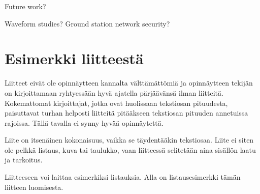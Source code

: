 \documentclass[english, 12pt, a4paper, elec, utf8, a-1b, online]{aaltothesis}
\begin{document}
Future work?

Waveform studies?
Ground station network security?







\clearpage

\thesisbibliography




\clearpage

\thesisappendix

\section{Esimerkki liitteest\"a\label{LiiteA}}

Liitteet eiv\"at ole opinn\"aytteen kannalta v\"altt\"am\"att\"omi\"a ja 
opinn\"aytteen tekij\"an on 
kirjoittamaan ryhtyess\"a\"an hyv\"a ajatella p\"arj\"a\"av\"ans\"a ilman liitteit\"a.
Kokemattomat kirjoittajat, jotka ovat huolissaan
tekstiosan pituudesta, paisuttavat turhan 
helposti liitteit\"a pit\"a\"akseen tekstiosan pituuden annetuissa rajoissa.
T\"all\"a tavalla ei synny hyv\"a\"a opinn\"aytett\"a.

Liite on itsen\"ainen kokonaisuus, vaikka se t\"aydent\"a\"akin tekstiosaa.
Liite ei siten ole pelkk\"a listaus, kuva tai taulukko, vaan 
liitteess\"a selitet\"a\"an aina sis\"all\"on laatu ja tarkoitus.

Liitteeseen voi laittaa esimerkiksi listauksia. Alla on 
listausesimerkki t\"am\"an liitteen luomisesta.
\end{document}
